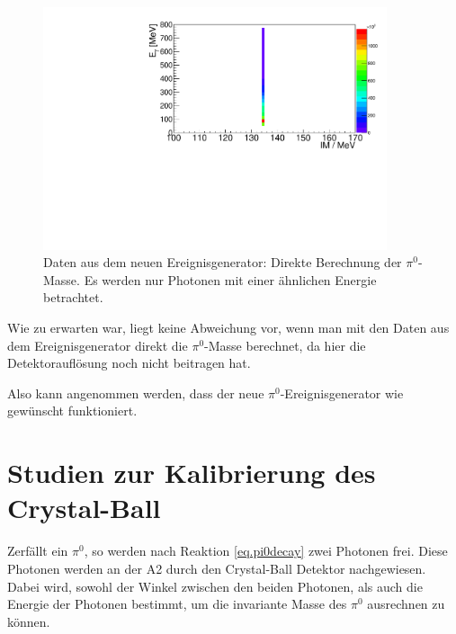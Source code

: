 \documentclass[a4paper,11pt,oneside,final,german,openbib,pdftex]{scrbook}
\begin{document}
{\begin{figure}[h!]
		\centering
		\includegraphics[width=0.9\textwidth]{20172504MCTrueME1}
		\caption[Ereignisgenerator: Direkte Berechnung der $\pi^0$-Masse]{Daten aus dem neuen Ereignisgenerator: Direkte Berechnung der $\pi^0$-Masse. Es werden nur Photonen mit einer \"ahnlichen Energie betrachtet.}
		\label{fig:Direkte-Berechnung-der-PI-Masse}

\end{figure}

Wie zu erwarten war, liegt keine Abweichung vor, wenn man mit den Daten aus dem Ereignisgenerator direkt die $\pi^0$-Masse berechnet, da hier die Detektoraufl\"osung noch nicht beitragen hat.

Also kann angenommen werden, dass der neue $\pi^0$-Ereignisgenerator wie gewünscht funktioniert.











\chapter{Studien zur Kalibrierung des Crystal-Ball}
\label{chap:Studien}

Zerf\"allt ein $\pi^0$, so werden nach Reaktion \ref{eq.pi0decay} zwei Photonen frei. Diese Photonen werden an der A2 durch den Crystal-Ball Detektor nachgewiesen. Dabei wird, sowohl der Winkel zwischen den beiden Photonen, als auch die Energie der Photonen bestimmt, um die invariante Masse des $\pi^0$ ausrechnen zu k\"onnen.
\newline

}
\end{document}
